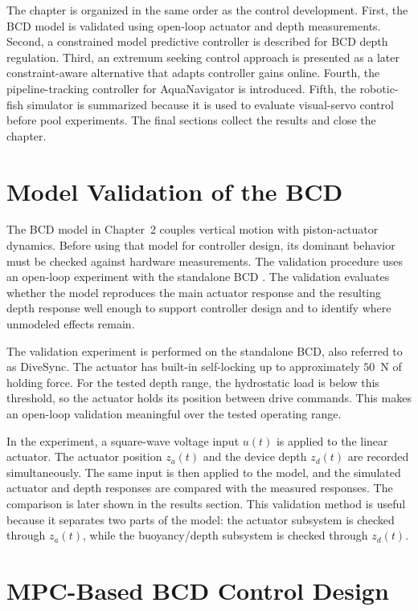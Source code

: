 \documentclass{uhcoethesis}
\begin{document}
The chapter is organized in the same order as the control development. First, the BCD model is validated using open-loop actuator and depth measurements. Second, a constrained model predictive controller is described for BCD depth regulation. Third, an extremum seeking control approach is presented as a later constraint-aware alternative that adapts controller gains online. Fourth, the pipeline-tracking controller for AquaNavigator is introduced. Fifth, the robotic-fish simulator is summarized because it is used to evaluate visual-servo control before pool experiments. The final sections collect the results and close the chapter.

\section{Model Validation of the BCD}

The BCD model in Chapter~2 couples vertical motion with piston-actuator dynamics. Before using that model for controller design, its dominant behavior must be checked against hardware measurements. The validation procedure uses an open-loop experiment with the standalone BCD \cite{Masood2026ESCBCD}. The validation evaluates whether the model reproduces the main actuator response and the resulting depth response well enough to support controller design and to identify where unmodeled effects remain.

The validation experiment is performed on the standalone BCD, also referred to as DiveSync. The actuator has built-in self-locking up to approximately $50$~N of holding force. For the tested depth range, the hydrostatic load is below this threshold, so the actuator holds its position between drive commands. This makes an open-loop validation meaningful over the tested operating range.

In the experiment, a square-wave voltage input $u(t)$ is applied to the linear actuator. The actuator position $z_a(t)$ and the device depth $z_d(t)$ are recorded simultaneously. The same input is then applied to the model, and the simulated actuator and depth responses are compared with the measured responses. The comparison is later shown in the results section. This validation method is useful because it separates two parts of the model: the actuator subsystem is checked through $z_a(t)$, while the buoyancy/depth subsystem is checked through $z_d(t)$.

\section{MPC-Based BCD Control Design}
\end{document}
